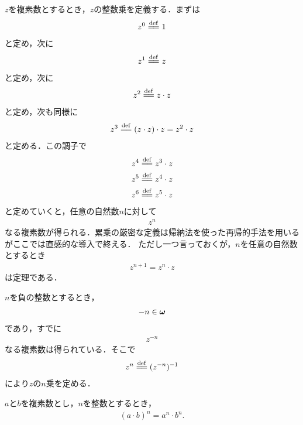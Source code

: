 	$z$を複素数とするとき，$z$の整数乗を定義する．まずは
	\begin{align}
		z^0 \defeq 1
	\end{align}
	と定め，次に
	\begin{align}
		z^1 \defeq z
	\end{align}
	と定め，次に
	\begin{align}
		z^2 \defeq z \cdot z
	\end{align}
	と定め，次も同様に
	\begin{align}
		z^3 \defeq (z \cdot z) \cdot z = z^2 \cdot z
	\end{align}
	と定める．この調子で
	\begin{align}
		z^4 &\defeq z^3 \cdot z \\
		z^5 &\defeq z^4 \cdot z \\
		z^6 &\defeq z^5 \cdot z \\
	\end{align}
	と定めていくと，任意の自然数$n$に対して
	\begin{align}
		z^n
	\end{align}
	なる複素数が得られる．累乗の厳密な定義は帰納法を使った再帰的手法を用いるがここでは直感的な導入で終える．
	ただし一つ言っておくが，$n$を任意の自然数とするとき
	\begin{align}
		z^{n+1} = z^n \cdot z
	\end{align}
	は定理である．
	
	$n$を負の整数とするとき，
	\begin{align}
		-n \in {\boldsymbol \omega}
	\end{align}
	であり，すでに
	\begin{align}
		z^{-n}
	\end{align}
	なる複素数は得られている．そこで
	\begin{align}
		z^n \defeq (z^{-n})^{-1}
	\end{align}
	により$z$の$n$乗を定める．
	
	\begin{screen}
		\begin{thm}[積の累乗は累乗の積]
			$a$と$b$を複素数とし，$n$を整数とするとき，
			\begin{align}
				(a \cdot b)^n = a^n \cdot b^n.
			\end{align}
		\end{thm}
	\end{screen}
	

